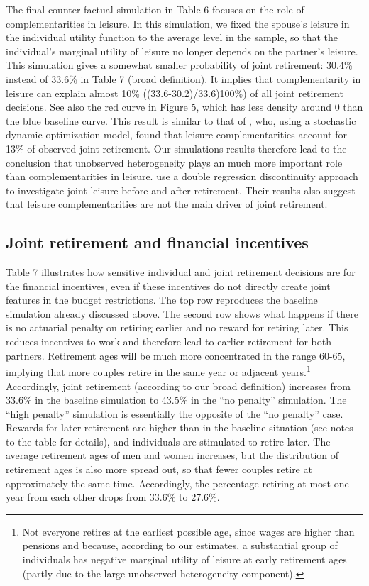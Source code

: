 \documentclass[11pt,letter]{article}
\begin{document}
\par The final counter-factual simulation in Table 6 focuses on the role of complementarities in leisure. In this simulation, we fixed the spouse's leisure in the individual utility function to the average level in the sample, so that the individual's marginal utility of leisure no longer depends on the partner's leisure. This simulation gives a somewhat smaller probability of joint retirement: 30.4\% instead of 33.6\% in Table 7 (broad definition). It implies that complementarity in leisure can explain almost 10\% ((33.6-30.2)/33.6)100\%) of all joint retirement decisions. See also the red curve in Figure 5, which has less density around 0 than the blue baseline curve. This result is similar to that of \citet{casanova2010}, who, using a stochastic dynamic optimization model, found that leisure complementarities account for 13\% of observed joint retirement. Our simulations results therefore lead to the conclusion that unobserved heterogeneity plays an much more important role than complementarities in leisure. \citet{elena2016} use a double regression discontinuity approach to investigate joint leisure before and after retirement. Their results also suggest that leisure complementarities are not the main driver of joint retirement.

\subsection*{Joint retirement and financial incentives}
Table 7 illustrates how sensitive individual and joint retirement decisions are for the financial incentives, even if these incentives do not directly create joint features in the budget restrictions. The top row reproduces the baseline simulation already discussed above. The second row shows what happens if there is no actuarial penalty on retiring earlier and no reward for retiring later. This reduces incentives to work and therefore lead to earlier retirement for both partners. Retirement ages will be much more concentrated in the range 60-65, implying that more couples retire in the same year or adjacent years.\footnote{Not everyone retires at the earliest possible age, since wages are higher than pensions and because, according to our estimates, a substantial group of individuals has negative marginal utility of leisure at early retirement ages (partly due to the large unobserved heterogeneity component).} Accordingly, joint retirement (according to our broad definition) increases from 33.6\% in the baseline simulation to 43.5\% in the ``no penalty'' simulation. The ``high penalty'' simulation is essentially the opposite of the ``no penalty'' case. Rewards for later retirement are higher than in the baseline situation (see notes to the table for details), and individuals are stimulated to retire later. The average retirement ages of men and women increases, but the distribution of retirement ages is also more spread out, so that fewer couples retire at approximately the same time. Accordingly, the percentage retiring at most one year from each other drops from 33.6\% to 27.6\%.
\end{document}
